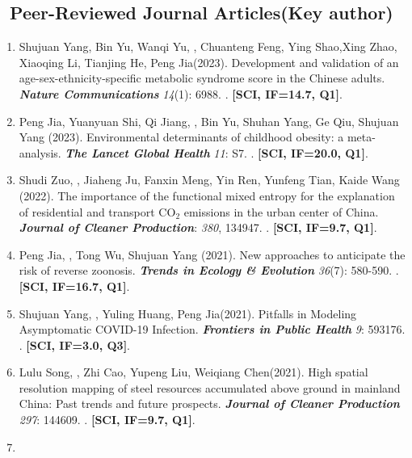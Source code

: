 \subsection*{\texorpdfstring{\faBook\ Peer-Reviewed Journal Articles(Key author)}{Peer-Reviewed Journal Articles(Key author)}}
\begin{enumerate}
\item
    Shujuan Yang, Bin Yu, Wanqi Yu, \Shaoqing, Chuanteng Feng, Ying Shao,Xing Zhao, Xiaoqing Li, Tianjing He, Peng Jia\CS (2023).
    Development and validation of an age-sex-ethnicity-specific metabolic syndrome score in the Chinese adults.
    \textbf{\textit{Nature Communications}} \textit{14}(1): 6988.
    . \textbf{[SCI, IF=14.7, Q1]}.
\item
    Peng Jia\CS, Yuanyuan Shi, Qi Jiang, \Shaoqing, Bin Yu, Shuhan Yang, Ge Qiu, Shujuan Yang (2023).
    Environmental determinants of childhood obesity: a meta-analysis.
    \textbf{\textit{The Lancet Global Health}} \textit{11}: S7.
    . \textbf{[SCI, IF=20.0, Q1]}.
\item
    Shudi Zuo\CS, \Shaoqing, Jiaheng Ju, Fanxin Meng, Yin Ren, Yunfeng Tian, Kaide Wang (2022).
    The importance of the functional mixed entropy for the explanation of residential and transport CO$_2$ emissions in the urban center of China.
    \textbf{\textit{Journal of Cleaner Production}}: \textit{380}, 134947.
    . \textbf{[SCI, IF=9.7, Q1]}.
\item
    Peng Jia\CS, \Shaoqing, Tong Wu, Shujuan Yang (2021).
    New approaches to anticipate the risk of reverse zoonosis.
    \textbf{\textit{Trends in Ecology \& Evolution}} \textit{36}(7): 580-590.
    . \textbf{[SCI, IF=16.7, Q1]}.
\item
    Shujuan Yang, \Shaoqing, Yuling Huang, Peng Jia\CS (2021).
    Pitfalls in Modeling Asymptomatic COVID-19 Infection.
    \textbf{\textit{Frontiers in Public Health}} \textit{9}: 593176.
    . \textbf{[SCI, IF=3.0, Q3]}.
\item
    Lulu Song, \Shaoqing, Zhi Cao, Yupeng Liu, Weiqiang Chen\CS (2021).
    High spatial resolution mapping of steel resources accumulated above ground in mainland China: Past trends and future prospects.
    \textbf{\textit{Journal of Cleaner Production}} \textit{297}: 144609.
    . \textbf{[SCI, IF=9.7, Q1]}.
\item

\end{enumerate}
